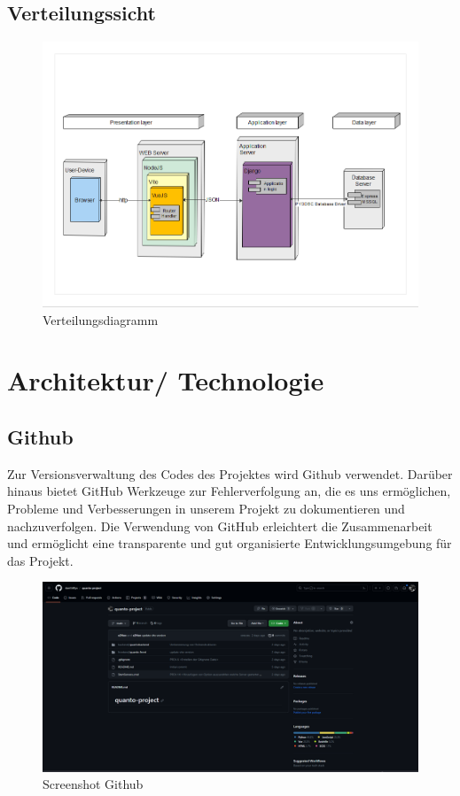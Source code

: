 \documentclass{article}
\begin{document}
    \subsection{ Verteilungssicht}
        \begin{figure}[h]
  
            \includegraphics[width= \textwidth]{images/Verteilungssicht.png}
            \caption{Verteilungsdiagramm}
            \label{fig:beispiel}
        \end{figure}

\newpage

\section{Architektur/ Technologie}

    \subsection{Github}
    Zur Versionsverwaltung des Codes des Projektes wird Github verwendet. Darüber hinaus bietet GitHub Werkzeuge zur Fehlerverfolgung an, die es uns ermöglichen, Probleme und Verbesserungen in unserem Projekt zu dokumentieren und nachzuverfolgen. Die Verwendung von GitHub erleichtert die Zusammenarbeit und ermöglicht eine transparente und gut organisierte Entwicklungsumgebung für das Projekt.
    
    \begin{figure}[h]
        \centering
        \includegraphics[width= \textwidth]{images/GitHub.png}
        \caption{Screenshot Github}
        \label{fig:beispiel}
    \end{figure}
\end{document}
